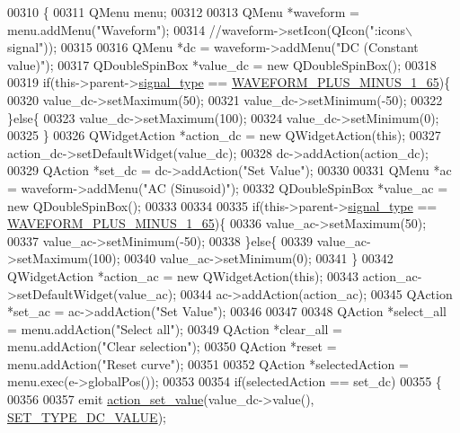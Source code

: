 \begin{DoxyCode}
00310 \{
00311     QMenu menu;
00312 
00313     QMenu   *waveform = menu.addMenu(\textcolor{stringliteral}{"Waveform"});
00314              \textcolor{comment}{//waveform->setIcon(QIcon(":icons\(\backslash\)signal"));}
00315 
00316     QMenu   *dc = waveform->addMenu(\textcolor{stringliteral}{"DC (Constant value)"});
00317     QDoubleSpinBox *value\_dc = \textcolor{keyword}{new} QDoubleSpinBox();
00318 
00319     \textcolor{keywordflow}{if}(this->parent->\hyperlink{a00008_a070edaec5aee6ba1f5a6866bc32c8ce4}{signal\_type} == \hyperlink{a00090_a0923d3b365a36e1e8c401cec964aa36f}{WAVEFORM\_PLUS\_MINUS\_1\_65})\{
00320     value\_dc->setMaximum(50);
00321     value\_dc->setMinimum(-50);
00322     \}\textcolor{keywordflow}{else}\{
00323     value\_dc->setMaximum(100);
00324     value\_dc->setMinimum(0);
00325     \}
00326     QWidgetAction *action\_dc = \textcolor{keyword}{new} QWidgetAction(\textcolor{keyword}{this});
00327     action\_dc->setDefaultWidget(value\_dc);
00328     dc->addAction(action\_dc);
00329     QAction *set\_dc = dc->addAction(\textcolor{stringliteral}{"Set Value"});
00330 
00331     QMenu   *ac = waveform->addMenu(\textcolor{stringliteral}{"AC (Sinusoid)"});
00332     QDoubleSpinBox *value\_ac = \textcolor{keyword}{new} QDoubleSpinBox();
00333 
00334 
00335     \textcolor{keywordflow}{if}(this->parent->\hyperlink{a00008_a070edaec5aee6ba1f5a6866bc32c8ce4}{signal\_type} == \hyperlink{a00090_a0923d3b365a36e1e8c401cec964aa36f}{WAVEFORM\_PLUS\_MINUS\_1\_65})\{
00336     value\_ac->setMaximum(50);
00337     value\_ac->setMinimum(-50);
00338     \}\textcolor{keywordflow}{else}\{
00339     value\_ac->setMaximum(100);
00340     value\_ac->setMinimum(0);
00341     \}
00342     QWidgetAction *action\_ac = \textcolor{keyword}{new} QWidgetAction(\textcolor{keyword}{this});
00343     action\_ac->setDefaultWidget(value\_ac);
00344     ac->addAction(action\_ac);
00345     QAction *set\_ac = ac->addAction(\textcolor{stringliteral}{"Set Value"});
00346 
00347 
00348     QAction *select\_all = menu.addAction(\textcolor{stringliteral}{"Select all"});
00349     QAction *clear\_all = menu.addAction(\textcolor{stringliteral}{"Clear selection"});
00350     QAction *reset = menu.addAction(\textcolor{stringliteral}{"Reset curve"});
00351 
00352     QAction *selectedAction = menu.exec(e->globalPos());
00353 
00354     \textcolor{keywordflow}{if}(selectedAction == set\_dc)
00355     \{
00356 
00357         emit \hyperlink{a00077_a886f07f2c612121bec703581f9398a10}{action\_set\_value}(value\_dc->value(),
      \hyperlink{a00090_a347f6ec80828b93988d22989c0df015f}{SET\_TYPE\_DC\_VALUE});

\end{DoxyCode}
